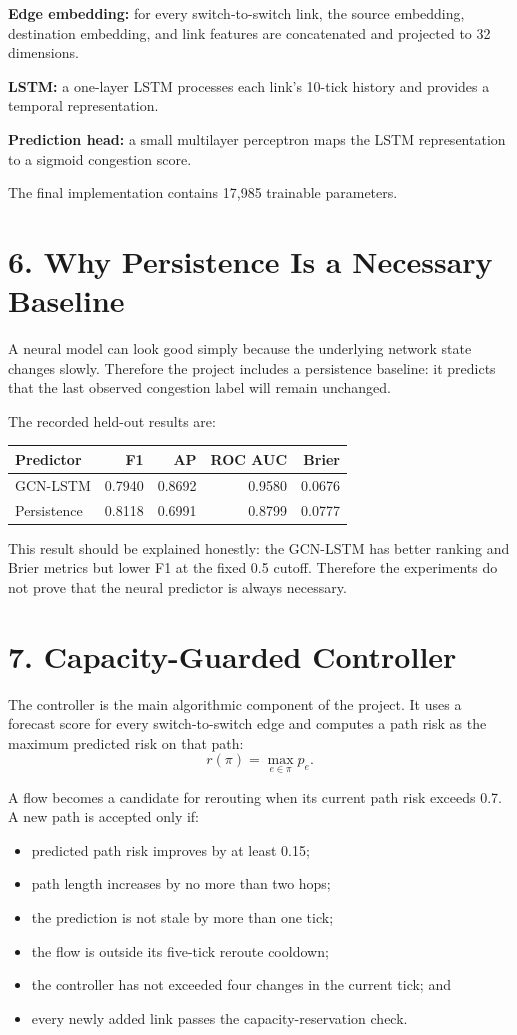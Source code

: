 \documentclass[11pt]{article}
\begin{document}
\textbf{Edge embedding:} for every switch-to-switch link, the source embedding, destination embedding, and link features are concatenated and projected to 32 dimensions.

\textbf{LSTM:} a one-layer LSTM processes each link's 10-tick history and provides a temporal representation.

\textbf{Prediction head:} a small multilayer perceptron maps the LSTM representation to a sigmoid congestion score.

The final implementation contains 17,985 trainable parameters.

\section*{6. Why Persistence Is a Necessary Baseline}
A neural model can look good simply because the underlying network state changes slowly. Therefore the project includes a persistence baseline: it predicts that the last observed congestion label will remain unchanged.

The recorded held-out results are:
\begin{center}
\begin{tabular}{lrrrr}
\toprule
Predictor & F1 & AP & ROC AUC & Brier\\
\midrule
GCN-LSTM & 0.7940 & 0.8692 & 0.9580 & 0.0676\\
Persistence & 0.8118 & 0.6991 & 0.8799 & 0.0777\\
\bottomrule
\end{tabular}
\end{center}

This result should be explained honestly: the GCN-LSTM has better ranking and Brier metrics but lower F1 at the fixed 0.5 cutoff. Therefore the experiments do not prove that the neural predictor is always necessary.

\section*{7. Capacity-Guarded Controller}
The controller is the main algorithmic component of the project. It uses a forecast score for every switch-to-switch edge and computes a path risk as the maximum predicted risk on that path:
\[
r(\pi)=\max_{e\in\pi} p_e.
\]

A flow becomes a candidate for rerouting when its current path risk exceeds 0.7. A new path is accepted only if:
\begin{itemize}[leftmargin=*]
    \item predicted path risk improves by at least 0.15;
    \item path length increases by no more than two hops;
    \item the prediction is not stale by more than one tick;
    \item the flow is outside its five-tick reroute cooldown;
    \item the controller has not exceeded four changes in the current tick; and
    \item every newly added link passes the capacity-reservation check.
\end{itemize}
\end{document}
